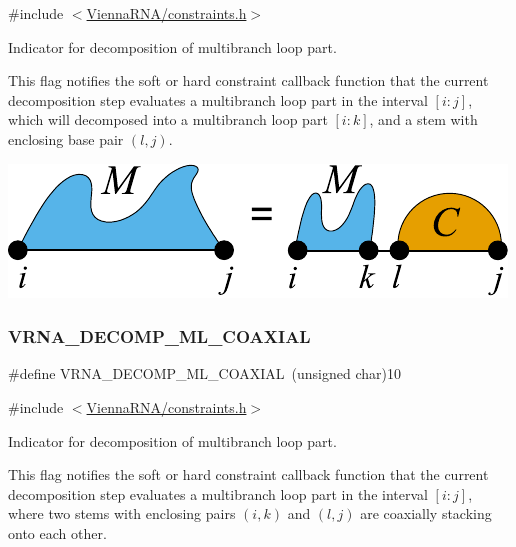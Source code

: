 {\ttfamily \#include $<$\hyperlink{constraints_8h}{Vienna\+R\+N\+A/constraints.\+h}$>$}



Indicator for decomposition of multibranch loop part. 

This flag notifies the soft or hard constraint callback function that the current decomposition step evaluates a multibranch loop part in the interval $[i:j]$, which will decomposed into a multibranch loop part $[i:k]$, and a stem with enclosing base pair $(l,j)$.

 
\begin{DoxyImageNoCaption}
  \mbox{\includegraphics[width=\textwidth,height=\textheight/2,keepaspectratio=true]{decomp_ml_ml_stem}}
\end{DoxyImageNoCaption}
 \mbox{\label{group__constraints_ga4fe48d575830b16c208e280e01ab1497}} 
\subsubsection{\texorpdfstring{V\+R\+N\+A\+\_\+\+D\+E\+C\+O\+M\+P\+\_\+\+M\+L\+\_\+\+C\+O\+A\+X\+I\+AL}{VRNA\_DECOMP\_ML\_COAXIAL}}
{\footnotesize\ttfamily \#define V\+R\+N\+A\+\_\+\+D\+E\+C\+O\+M\+P\+\_\+\+M\+L\+\_\+\+C\+O\+A\+X\+I\+AL~(unsigned char)10}



{\ttfamily \#include $<$\hyperlink{constraints_8h}{Vienna\+R\+N\+A/constraints.\+h}$>$}



Indicator for decomposition of multibranch loop part. 

This flag notifies the soft or hard constraint callback function that the current decomposition step evaluates a multibranch loop part in the interval $[i:j]$, where two stems with enclosing pairs $(i,k)$ and $(l,j)$ are coaxially stacking onto each other.

